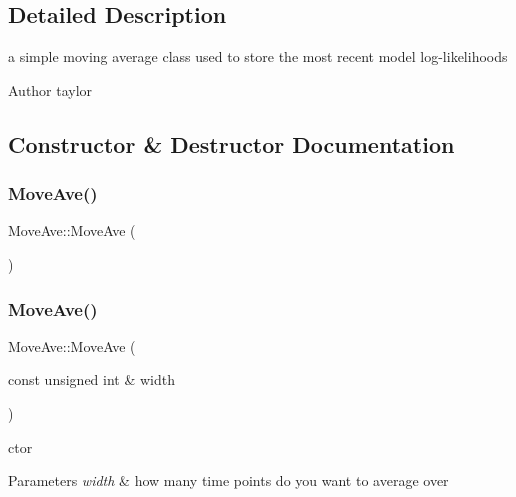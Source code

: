 \subsection{Detailed Description}
a simple moving average class used to store the most recent model log-\/likelihoods 

\begin{DoxyAuthor}{Author}
taylor 
\end{DoxyAuthor}


\subsection{Constructor \& Destructor Documentation}
\mbox{\label{classMoveAve_a7ba3aea659277902e633d1fca06ddc36}} 
\subsubsection{\texorpdfstring{Move\+Ave()}{MoveAve()}\hspace{0.1cm}{\footnotesize\ttfamily [1/2]}}
{\footnotesize\ttfamily Move\+Ave\+::\+Move\+Ave (\begin{DoxyParamCaption}{ }\end{DoxyParamCaption})\hspace{0.3cm}{\ttfamily [delete]}}

\mbox{\label{classMoveAve_a455db6dea545c3bb47fed299740c5031}} 
\subsubsection{\texorpdfstring{Move\+Ave()}{MoveAve()}\hspace{0.1cm}{\footnotesize\ttfamily [2/2]}}
{\footnotesize\ttfamily Move\+Ave\+::\+Move\+Ave (\begin{DoxyParamCaption}\item[{const unsigned int \&}]{width }\end{DoxyParamCaption})}



ctor 


\begin{DoxyParams}{Parameters}
{\em width} & how many time points do you want to average over \\
\hline
\end{DoxyParams}


